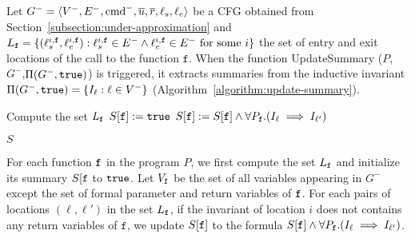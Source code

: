 Let $G^- = \langle V^-, E^-, \textmd{cmd}^-, \overline{u}, \overline{r},\ell_s,\ell_e \rangle$ be a CFG obtained from Section~\ref{subsection:under-approximation} and $L_{\mathtt{{f}}}=\{(\ell_s^{i,\mathtt{{f}}},\ell_e^{i,\mathtt{{f}}}):\ell_s^{i,\mathtt{{f}}}\in E^- \wedge \ell_e^{i,\mathtt{{f}}}\in E^-\mbox{ for some }i\}$
the set of entry and exit locations of the call to the function $\mathtt{f}$.
When the function UpdateSummary ($P$, $G^-$,$\Pi (G^-, \mathtt{true})$) is triggered, it extracts summaries from the inductive invariant $\Pi (G^-, \mathtt{true})= \{ I_\ell : \ell \in V^-
\}$ (Algorithm~\ref{algorithm:update-summary}). 

\begin{algorithm}

  {	
  	Compute the set $L_{\mathtt{{f}}}$\;
  	$S[\mathtt{{f}}]:=\mathtt{true}$\;
   	{
       	{
         		$S[\mathtt{{f}}]:=S[\mathtt{{f}}]\wedge \forall P_\mathtt{f}. (I_\ell \implies I_{\ell'})$\;
       	}	
   	}
    
  }
 
  \Return $S$\;
  \caption{$\textmd{UpdateSummary} (P, G^-,\Pi (G^-, \TT))$}
  \label{algorithm:update-summary}
\end{algorithm}

For each function $\mathtt{{f}}$ in the program $P$, we first compute the set $L_{\mathtt{{f}}}$  and initialize its summary $S[\mathtt{{f}}$ to $\mathtt{true}$.
Let $V_{\mathtt{{f}}}$ be the set of all variables appearing in $G^-$ except the set of formal parameter and return variables of $\mathtt{{f}}$.
For each pairs of locations $(\ell,\ell')$ in the set $L_{\mathtt{{f}}}$, if the invariant of location $i$ does not contains any return variables of $\mathtt{f}$, we update $S[\mathtt{{f}}]$ to the formula $S[\mathtt{{f}}]\wedge \forall P_\mathtt{f}. (I_\ell \implies I_{\ell'})$.

